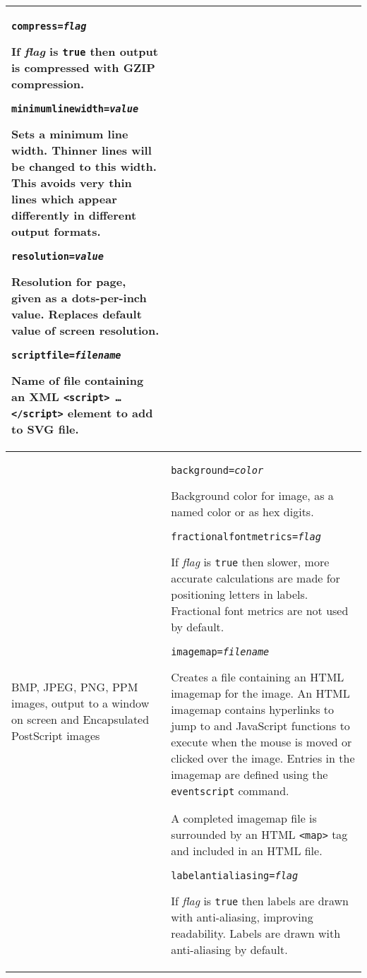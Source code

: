 \begin{longtable}{|p{4cm}|p{10cm}|}
\vspace{10pt}
\texttt{compress=\textit{flag}}

If \textit{flag} is \texttt{true} then output is compressed with GZIP
compression.

\vspace{10pt}
\texttt{minimumlinewidth=\textit{value}}

Sets a minimum line width.  Thinner lines will be changed to
this width.  This avoids very thin lines which appear differently
in different output formats.

\vspace{10pt}
\texttt{resolution=\textit{value}}

Resolution for page, given as a dots-per-inch value.  Replaces
default value of screen resolution.

\vspace{10pt}
\texttt{scriptfile=\textit{filename}}

Name of file containing an XML \texttt{<script> \ldots </script>}
element to add to SVG file. \\

\hline

BMP, JPEG, PNG, PPM images, output to a window on screen
and Encapsulated PostScript images &

\texttt{background=\textit{color}}

Background color for image, as a named color or as hex digits.

\vspace{10pt}
\texttt{fractionalfontmetrics=\textit{flag}}

If \textit{flag} is \texttt{true} then slower, more accurate
calculations are made for positioning letters in labels.
Fractional font metrics are not used by default.

\vspace{10pt}
\texttt{imagemap=\textit{filename}}

Creates a file containing an HTML imagemap for the image.
An HTML imagemap contains hyperlinks to jump to and JavaScript
functions to execute when the mouse is moved or clicked over the image.
Entries in the imagemap are defined using the \texttt{eventscript} command.

A completed imagemap file is surrounded by an HTML \texttt{<map>} tag
and included in an HTML file.

\vspace{10pt}
\texttt{labelantialiasing=\textit{flag}}

If \textit{flag} is \texttt{true} then
labels are drawn with anti-aliasing, improving readability.
Labels are drawn with anti-aliasing by default.


\end{longtable}
